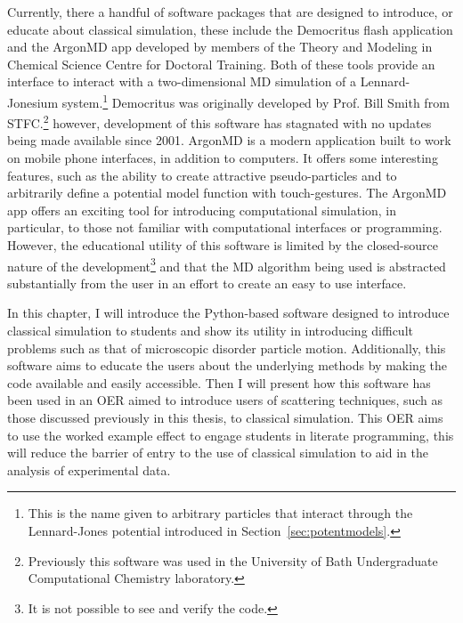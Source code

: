 Currently, there a handful of software packages that are designed to introduce, or educate about classical simulation, these include the Democritus flash application and the ArgonMD app developed by members of the Theory and Modeling in Chemical Science Centre for Doctoral Training.\autocite{noauthor_democritus_nodate,noauthor_argonmd_nodate}
Both of these tools provide an interface to interact with a two-dimensional MD simulation of a Lennard-Jonesium system.\footnote{This is the name given to arbitrary particles that interact through the Lennard-Jones potential introduced in Section~\ref{sec:potentmodels}.}
Democritus was originally developed by Prof. Bill Smith from STFC.\footnote{Previously this software was used in the University of Bath Undergraduate Computational Chemistry laboratory.} however, development of this software has stagnated with no updates being made available since 2001.
ArgonMD is a modern application built to work on mobile phone interfaces, in addition to computers.
It offers some interesting features, such as the ability to create attractive pseudo-particles and to arbitrarily define a potential model function with touch-gestures.
The ArgonMD app offers an exciting tool for introducing computational simulation, in particular, to those not familiar with computational interfaces or programming.
However, the educational utility of this software is limited by the closed-source nature of the development\footnote{It is not possible to see and verify the code.} and that the MD algorithm being used is abstracted substantially from the user in an effort to create an easy to use interface.

In this chapter, I will introduce the Python-based software designed to introduce classical simulation to students and show its utility in introducing difficult problems such as that of microscopic disorder particle motion.
Additionally, this software aims to educate the users about the underlying methods by making the code available and easily accessible.
Then I will present how this software has been used in an OER aimed to introduce users of scattering techniques, such as those discussed previously in this thesis, to classical simulation.
This OER aims to use the worked example effect to engage students in literate programming, this will reduce the barrier of entry to the use of classical simulation to aid in the analysis of experimental data.
